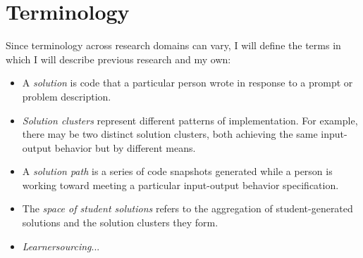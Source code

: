 \section{Terminology}


Since terminology across research domains can vary, I will define the terms in which I will describe previous research and my own: 
\begin{itemize}
\item A {\it solution} is code that a particular person wrote in response to a prompt or problem description.
\item {\it Solution clusters} represent different patterns of implementation. For example, there may be two distinct solution clusters, both achieving the same input-output behavior but by different means. 
\item A {\it solution path} is a series of code snapshots generated while a person is working toward meeting a particular input-output behavior specification. 
\item The {\it space of student solutions} refers to the aggregation of student-generated solutions and the solution clusters they form.
\item {\it Learnersourcing}... 
\end{itemize}

